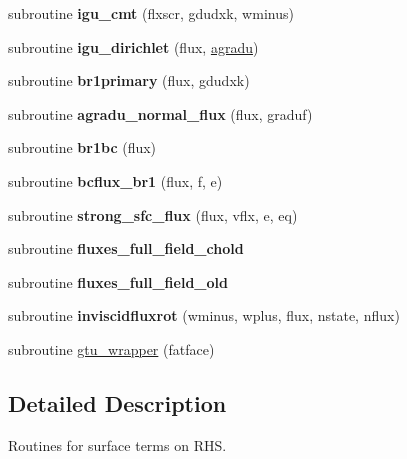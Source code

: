 \begin{DoxyCompactItemize}
\item 
\hypertarget{group__flux_ga28b5864db9a8cc5516dff0524e5281dd}{subroutine {\bfseries igu\-\_\-cmt} (flxscr, gdudxk, wminus)}\label{group__flux_ga28b5864db9a8cc5516dff0524e5281dd}

\item 
\hypertarget{group__flux_ga9e1df29c0b6ddab6d384439c68f98361}{subroutine {\bfseries igu\-\_\-dirichlet} (flux, \hyperlink{group__vfjac_ga9087d56c6c467d3ffeb9aa6be3f43e82}{agradu})}\label{group__flux_ga9e1df29c0b6ddab6d384439c68f98361}

\item 
\hypertarget{group__flux_ga549c3560ff566ecc4ebe5a26cd8d7434}{subroutine {\bfseries br1primary} (flux, gdudxk)}\label{group__flux_ga549c3560ff566ecc4ebe5a26cd8d7434}

\item 
\hypertarget{group__flux_gaf5460e23edcfc140cce7884a9e3ebdac}{subroutine {\bfseries agradu\-\_\-normal\-\_\-flux} (flux, graduf)}\label{group__flux_gaf5460e23edcfc140cce7884a9e3ebdac}

\item 
\hypertarget{group__flux_gaf39815444396f97adffa0273bf02d6e5}{subroutine {\bfseries br1bc} (flux)}\label{group__flux_gaf39815444396f97adffa0273bf02d6e5}

\item 
\hypertarget{group__flux_gad4b2470bb6d756ae16a22aa09bff20cd}{subroutine {\bfseries bcflux\-\_\-br1} (flux, f, e)}\label{group__flux_gad4b2470bb6d756ae16a22aa09bff20cd}

\item 
\hypertarget{group__flux_gadcea35e25dbe44ed6a9f9816974a8dc7}{subroutine {\bfseries strong\-\_\-sfc\-\_\-flux} (flux, vflx, e, eq)}\label{group__flux_gadcea35e25dbe44ed6a9f9816974a8dc7}

\item 
\hypertarget{group__flux_ga565a7f26aa4697a900499931ca224e37}{subroutine {\bfseries fluxes\-\_\-full\-\_\-field\-\_\-chold}}\label{group__flux_ga565a7f26aa4697a900499931ca224e37}

\item 
\hypertarget{group__flux_gade9f72409b237ebd1810b9d856f2c0d2}{subroutine {\bfseries fluxes\-\_\-full\-\_\-field\-\_\-old}}\label{group__flux_gade9f72409b237ebd1810b9d856f2c0d2}

\item 
\hypertarget{group__flux_gae3c480e559a6d01be27381e8517a210d}{subroutine {\bfseries inviscidfluxrot} (wminus, wplus, flux, nstate, nflux)}\label{group__flux_gae3c480e559a6d01be27381e8517a210d}

\item 
subroutine \hyperlink{group__flux_gab4541d3a9fc0c10583e47fa4b6cc9f2d}{gtu\-\_\-wrapper} (fatface)
\end{DoxyCompactItemize}



\subsection{Detailed Description}
Routines for surface terms on R\-H\-S. 